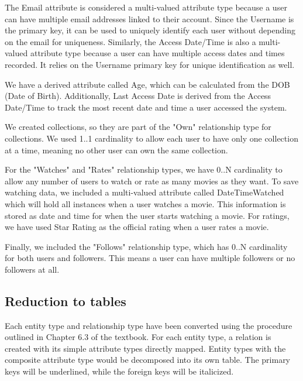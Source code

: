 \documentclass[12pt]{article}
\begin{document}
{{        The Email attribute is considered a multi-valued attribute type because a user can have multiple email addresses linked to their account. Since the Username is the primary key, it can be used to uniquely identify each user without depending on the email for uniqueness. Similarly, the Access Date/Time is also a multi-valued attribute type because a user can have multiple access dates and times recorded. It relies on the Username primary key for unique identification as well.
    
        We have a derived attribute called Age, which can be calculated from the DOB (Date of Birth). Additionally, Last Access Date is derived from the Access Date/Time to track the most recent date and time a user accessed the system.

        We created collections, so they are part of the "Own" relationship type for collections. We used 1..1 cardinality to allow each user to have only one collection at a time, meaning no other user can own the same collection.

        For the "Watches" and "Rates" relationship types, we have 0..N cardinality to allow any number of users to watch or rate as many movies as they want. To save watching data, we included a multi-valued attribute called DateTimeWatched which will hold all instances when a user watches a movie. This information is stored as date and time for when the user starts watching a movie. For ratings, we have used Star Rating as the official rating when a user rates a movie.

        Finally, we included the "Follows" relationship type, which has 0..N cardinality for both users and followers. This means a user can have multiple followers or no followers at all.
    }
}

\subsection{Reduction to tables}

Each entity type and relationship type have been converted using the procedure outlined in Chapter 6.3 of the textbook. For each entity type, a relation is created with its simple attribute types directly mapped. Entity types with the composite attribute type would be decomposed into its own table. The primary keys will be underlined, while the foreign keys will be italicized.\\
\end{document}
